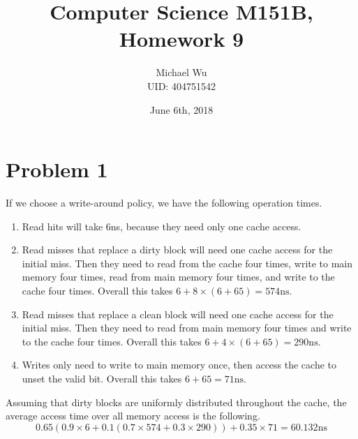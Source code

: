 \documentclass[12pt]{article}
\begin{document}
\title{Computer Science M151B, Homework 9}
\date{June 6th, 2018}
\author{Michael Wu\\UID: 404751542}
\maketitle

\section*{Problem 1}

If we choose a write-around policy, we have the following operation times.
\begin{enumerate}
        \item Read hits will take 6ns, because they need only one cache access.
        \item Read misses that replace a dirty block will need one cache access for the initial miss.
        Then they need to read from the cache four times, write to main memory four times, read from main memory four times,
        and write to the cache four times. Overall this takes \(6+8\times(6+65) = 574\text{ns}\).
        \item Read misses that replace a clean block will need one cache access for the initial miss.
        Then they need to read from main memory four times and write to the cache four times.
        Overall this takes \(6+4\times(6+65) = 290\text{ns}\).
        \item Writes only need to write to main memory once, then access the cache to unset the valid bit. Overall
        this takes \(6+65=71\text{ns}\).
\end{enumerate}
Assuming that dirty blocks are uniformly distributed throughout the cache, the average access time over all memory access is the following.
\[0.65(0.9\times 6+0.1(0.7\times 574+0.3\times 290))+0.35\times 71=60.132\text{ns}\]
\end{document}
